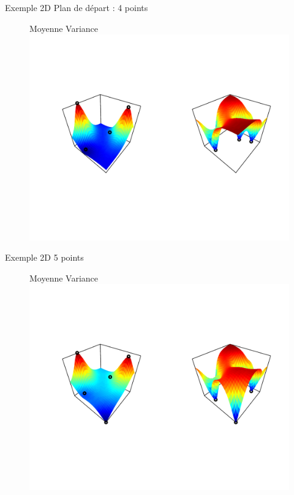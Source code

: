 \begin{frame}{Exemple 2D}
Plan de départ : 4 points
\begin{figure}
\hspace{5mm} Moyenne \hspace{50mm} Variance
	\includegraphics[trim=12mm 40mm 12mm 40mm,width=\textwidth, clip]{mse/maxMSE0.pdf}
\end{figure}
\end{frame}
\begin{frame}[noframenumbering]{Exemple 2D}
5 points
\begin{figure}
\hspace{5mm} Moyenne \hspace{50mm} Variance
	\includegraphics[trim=12mm 40mm 12mm 40mm,width=\textwidth, clip]{mse/maxMSE1.pdf}
\end{figure}
\end{frame}
